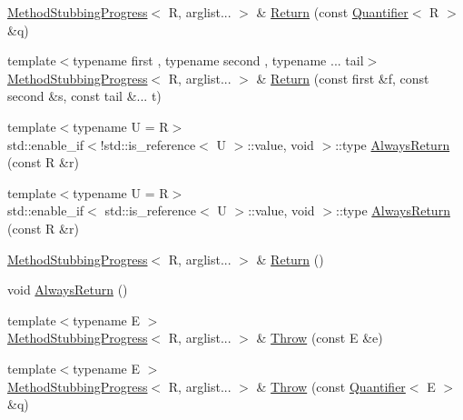 \begin{DoxyCompactItemize}
\item 
\mbox{\hyperlink{structfakeit_1_1MethodStubbingProgress}{Method\+Stubbing\+Progress}}$<$ R, arglist... $>$ \& \mbox{\hyperlink{structfakeit_1_1MethodStubbingProgress_acb4d4db8208a8eaadff77e7cbf3775db}{Return}} (const \mbox{\hyperlink{structfakeit_1_1Quantifier}{Quantifier}}$<$ R $>$ \&q)
\item 
{\footnotesize template$<$typename first , typename second , typename ... tail$>$ }\\\mbox{\hyperlink{structfakeit_1_1MethodStubbingProgress}{Method\+Stubbing\+Progress}}$<$ R, arglist... $>$ \& \mbox{\hyperlink{structfakeit_1_1MethodStubbingProgress_ae8417ec5f29f70be1ae914755b05e4db}{Return}} (const first \&f, const second \&s, const tail \&... t)
\item 
{\footnotesize template$<$typename U  = R$>$ }\\std\+::enable\+\_\+if$<$!std\+::is\+\_\+reference$<$ U $>$\+::value, void $>$\+::type \mbox{\hyperlink{structfakeit_1_1MethodStubbingProgress_a268ca122b518c0a34e80535d8f457549}{Always\+Return}} (const R \&r)
\item 
{\footnotesize template$<$typename U  = R$>$ }\\std\+::enable\+\_\+if$<$ std\+::is\+\_\+reference$<$ U $>$\+::value, void $>$\+::type \mbox{\hyperlink{structfakeit_1_1MethodStubbingProgress_a84cf6a4bf307cf8d49efb69b014e9b11}{Always\+Return}} (const R \&r)
\item 
\mbox{\hyperlink{structfakeit_1_1MethodStubbingProgress}{Method\+Stubbing\+Progress}}$<$ R, arglist... $>$ \& \mbox{\hyperlink{structfakeit_1_1MethodStubbingProgress_a4743b7e25e98cd6a2be2c03b7a9416d4}{Return}} ()
\item 
void \mbox{\hyperlink{structfakeit_1_1MethodStubbingProgress_a3f1ecf87f8c73b7f3276786914579f8b}{Always\+Return}} ()
\item 
{\footnotesize template$<$typename E $>$ }\\\mbox{\hyperlink{structfakeit_1_1MethodStubbingProgress}{Method\+Stubbing\+Progress}}$<$ R, arglist... $>$ \& \mbox{\hyperlink{structfakeit_1_1MethodStubbingProgress_ae3da30d02ba5de4bfa82f51bba5602c3}{Throw}} (const E \&e)
\item 
{\footnotesize template$<$typename E $>$ }\\\mbox{\hyperlink{structfakeit_1_1MethodStubbingProgress}{Method\+Stubbing\+Progress}}$<$ R, arglist... $>$ \& \mbox{\hyperlink{structfakeit_1_1MethodStubbingProgress_a93c74210adfc0ec4662aff15f78834c7}{Throw}} (const \mbox{\hyperlink{structfakeit_1_1Quantifier}{Quantifier}}$<$ E $>$ \&q)

\end{DoxyCompactItemize}
